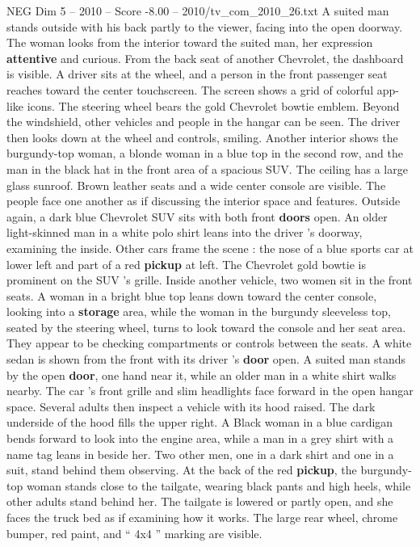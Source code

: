 \begin{textsample}{NEG Dim 5 – 2010 – Score -8.00 – 2010/tv\_com\_2010\_26.txt}
A suited man stands outside with his back partly to the viewer, facing into the open doorway.
The woman looks from the interior toward the suited man, her expression \textbf{attentive} and curious.
From the back seat of another Chevrolet, the dashboard is visible.
A driver sits at the wheel, and a person in the front passenger seat reaches toward the center touchscreen.
The screen shows a grid of colorful app-like icons.
The steering wheel bears the gold Chevrolet bowtie emblem.
Beyond the windshield, other vehicles and people in the hangar can be seen.
The driver then looks down at the wheel and controls, smiling.
Another interior shows the burgundy-top woman, a blonde woman in a blue top in the second row, and the man in the black hat in the front area of a spacious SUV.
The ceiling has a large glass sunroof.
Brown leather seats and a wide center console are visible.
The people face one another as if discussing the interior space and features.
Outside again, a dark blue Chevrolet SUV sits with both front \textbf{doors} open.
An older light-skinned man in a white polo shirt leans into the driver ’s doorway, examining the inside.
Other cars frame the scene : the nose of a blue sports car at lower left and part of a red \textbf{pickup} at left.
The Chevrolet gold bowtie is prominent on the SUV ’s grille.
Inside another vehicle, two women sit in the front seats.
A woman in a bright blue top leans down toward the center console, looking into a \textbf{storage} area, while the woman in the burgundy sleeveless top, seated by the steering wheel, turns to look toward the console and her seat area.
They appear to be checking compartments or controls between the seats.
A white sedan is shown from the front with its driver ’s \textbf{door} open.
A suited man stands by the open \textbf{door}, one hand near it, while an older man in a white shirt walks nearby.
The car ’s front grille and slim headlights face forward in the open hangar space.
Several adults then inspect a vehicle with its hood raised.
The dark underside of the hood fills the upper right.
A Black woman in a blue cardigan bends forward to look into the engine area, while a man in a grey shirt with a name tag leans in beside her.
Two other men, one in a dark shirt and one in a suit, stand behind them observing.
At the back of the red \textbf{pickup}, the burgundy-top woman stands close to the tailgate, wearing black pants and high heels, while other adults stand behind her.
The tailgate is lowered or partly open, and she faces the truck bed as if examining how it works.
The large rear wheel, chrome bumper, red paint, and “ 4x4 ” marking are visible.

\end{textsample}
